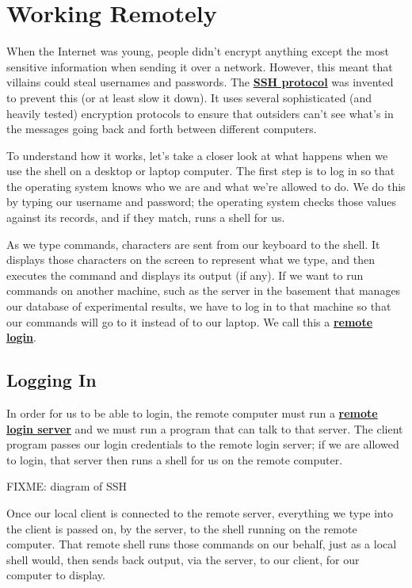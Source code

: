 \documentclass[
]{krantz}
\newcommand{\gref}[2]{\hyperlink{#2}{\textbf{#1}}}
\begin{document}
\hypertarget{ssh}{%
\chapter{Working Remotely}\label{ssh}}

When the Internet was young,
people didn't encrypt anything except the most sensitive information when sending it over a network.
However,
this meant that villains could steal usernames and passwords.
The \gref{SSH protocol}{ssh\_protocol}
was invented to prevent this (or at least slow it down).
It uses several sophisticated (and heavily tested) encryption protocols
to ensure that outsiders can't see what's in the messages
going back and forth between different computers.

To understand how it works,
let's take a closer look at what happens when we use the shell
on a desktop or laptop computer.
The first step is to log in
so that the operating system knows who we are and what we're allowed to do.
We do this by typing our username and password;
the operating system checks those values against its records,
and if they match,
runs a shell for us.

As we type commands,
characters are sent from our keyboard to the shell.
It displays those characters on the screen to represent what we type,
and then executes the command and displays its output (if any).
If we want to run commands on another machine,
such as the server in the basement that manages our database of experimental results,
we have to log in to that machine so that our commands will go to it instead of to our laptop.
We call this a \gref{remote login}{remote\_login}.

\hypertarget{ssh-login}{%
\section{Logging In}\label{ssh-login}}

In order for us to be able to login,
the remote computer must run a \gref{remote login server}{remote\_login\_server}
and we must run a program that can talk to that server.
The client program passes our login credentials to the remote login server;
if we are allowed to login,
that server then runs a shell for us on the remote computer.

FIXME: diagram of SSH

Once our local client is connected to the remote server,
everything we type into the client is passed on, by the server, to the shell
running on the remote computer.
That remote shell runs those commands on our behalf,
just as a local shell would,
then sends back output, via the server, to our client, for our computer to display.
\end{document}
